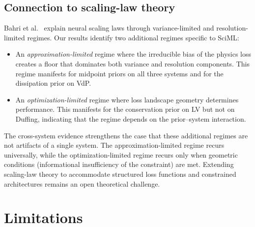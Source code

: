 \documentclass[11pt]{article}
\begin{document}
\subsection{Connection to scaling-law theory}

Bahri et al.~\cite{bahri2024} explain neural scaling laws through variance-limited and resolution-limited regimes.
Our results identify two additional regimes specific to SciML:
\begin{itemize}[leftmargin=*]
    \item An \emph{approximation-limited} regime where the irreducible bias of the physics loss creates a floor that dominates both variance and resolution components.
    This regime manifests for midpoint priors on all three systems and for the dissipation prior on VdP.
    \item An \emph{optimization-limited} regime where loss landscape geometry determines performance.
    This manifests for the conservation prior on LV but not on Duffing, indicating that the regime depends on the prior--system interaction.
\end{itemize}

The cross-system evidence strengthens the case that these additional regimes are not artifacts of a single system.
The approximation-limited regime recurs universally, while the optimization-limited regime recurs only when geometric conditions (informational insufficiency of the constraint) are met.
Extending scaling-law theory to accommodate structured loss functions and constrained architectures remains an open theoretical challenge.

\section{Limitations}
\end{document}
